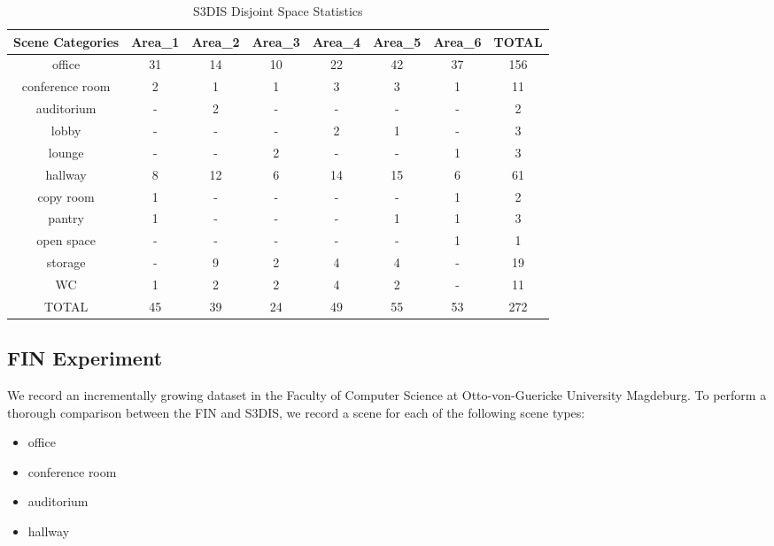 \documentclass[main.tex]{subfiles}
\begin{document}
\begin{table}[H]
    \centering
    \begin{tabular}{c|c|c|c|c|c|c|c}
        \hline
        Scene Categories & Area\_1 & Area\_2 & Area\_3 & Area\_4 & Area\_5 & Area\_6 & TOTAL \\ \hline
        office           & 31      & 14      & 10      & 22      & 42      & 37      & 156   \\ \hline
        conference room  & 2       & 1       & 1       & 3       & 3       & 1       & 11    \\ \hline
        auditorium       & -       & 2       & -       & -       & -       & -       & 2     \\ \hline
        lobby            & -       & -       & -       & 2       & 1       & -       & 3     \\ \hline
        lounge           & -       & -       & 2       & -       & -       & 1       & 3     \\ \hline
        hallway          & 8       & 12      & 6       & 14      & 15      & 6       & 61    \\ \hline
        copy room        & 1       & -       & -       & -       & -       & 1       & 2     \\ \hline
        pantry           & 1       & -       & -       & -       & 1       & 1       & 3     \\ \hline
        open space       & -       & -       & -       & -       & -       & 1       & 1     \\ \hline
        storage          & -       & 9       & 2       & 4       & 4       & -       & 19    \\ \hline
        WC               & 1       & 2       & 2       & 4       & 2       & -       & 11    \\ \hline
        TOTAL            & 45      & 39      & 24      & 49      & 55      & 53      & 272   \\
    \end{tabular}
    \caption{S3DIS Disjoint Space Statistics}
    \label{tab:stanfordStats}
\end{table}

\subsection{FIN Experiment}
We record an incrementally growing dataset in the Faculty of Computer Science at Otto-von-Guericke University Magdeburg.
To perform a thorough comparison between the FIN and S3DIS, we record a scene for each of the following scene types:
\begin{itemize}
    \item office
    \item conference room
    \item auditorium
    \item hallway
\end{itemize}
\end{document}
